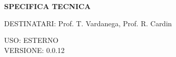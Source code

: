 \documentclass[5pt]{article}
\begin{document}
	\vspace{24pt}
	
	\begin{center}
		\textbf{\LARGE SPECIFICA TECNICA}
	\end{center}
	
	\vspace{13pt}
	
	\begin{flushleft}
		\begin{spacing}{1.5}
			DESTINATARI: Prof. T. Vardanega, Prof. R. Cardin\\%
		\end{spacing}
	\end{flushleft}
	
	\begin{flushright}
		\begin{spacing}{1}
			USO: ESTERNO\\
			VERSIONE: 0.0.12\\
		\end{spacing}
	\end{flushright}
	
	
	\restoregeometry
	
	\pagebreak
	
\end{document}

